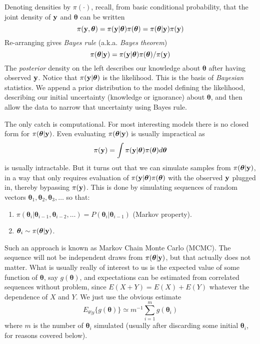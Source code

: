 \documentclass[10pt] {article}
\theoremstyle{definition}
\begin{document}
Denoting densities by $\pi(\cdot)$, recall, from basic conditional probability, that the joint density of ${\bf y}$ and ${\bm \theta}$ can be written
$$
\pi({\bf y}, {\bm \theta}) = \pi({\bf y} | {\bm \theta})\pi ({\bm \theta}) = \pi( {\bm \theta}|{\bf y})\pi ({\bf y})
$$
Re-arranging gives {\em Bayes rule} (a.k.a. {\em Bayes theorem})
$$
\pi( {\bm \theta}|{\bf y}) = \pi({\bf y} | {\bm \theta})\pi ({\bm \theta})/\pi({\bf y})
$$
The {\em posterior} density on the left describes our knowledge about $\bm \theta$ after having observed $\bf y$. Notice that $ \pi({\bf y} | {\bm \theta})$ is the likelihood. This is the basis of {\em Bayesian} statistics. We append a prior distribution to the model defining the likelihood, describing our initial uncertainty (knowledge or ignorance) about $\bm \theta$, and then allow the data to narrow that uncertainty using Bayes rule.

The only catch is computational. For most interesting models there is no closed form for $\pi( {\bm \theta}|{\bf y})$. Even evaluating $\pi( {\bm \theta}|{\bf y})$ is usually impractical as 
$$
\pi({\bf y}) = \int \pi({\bf y} | {\bm \theta})\pi ({\bm \theta}) d{\bm \theta}
$$
is usually intractable.
But it turns out that we can simulate samples from $\pi( {\bm \theta}|{\bf y})$, in a way that  only requires evaluation of $\pi({\bf y} | {\bm \theta})\pi ({\bm \theta})$ with the observed $\bf y$ plugged in, thereby bypassing $\pi ({\bf y})$. This is done by simulating sequences of random vectors ${\bm \theta}_1, {\bm \theta}_2, {\bm \theta}_3, \ldots $ so that:
\begin{enumerate}
\item $\pi({\bm \theta}_i|{\bm \theta}_{i-1},{\bm \theta}_{i-2},\ldots) = P({\bm \theta}_i|{\bm \theta}_{i-1})$ (Markov property).
\item ${\bm \theta}_i \sim \pi( {\bm \theta}|{\bf y})$.\end{enumerate}
Such an approach is known as Markov Chain Monte Carlo (MCMC). The sequence will not be independent draws from $ \pi( {\bm \theta}|{\bf y})$, but that actually does not matter. What is usually really of interest to us is the expected value of some function of $\bm \theta$, say $g({\bm \theta})$, and expectations can be estimated from correlated sequences without problem, since $E(X+Y) = E(X)+E(Y)$ whatever the dependence of $X $ and $Y$. We just use the obvious estimate
$$
E_{\theta|y}\{g({\bm \theta})\} \simeq m^{-1}\sum_{i=1}^m g({\bm \theta}_i)
$$ 
where $m$ is the number of ${\bm \theta}_i$ simulated (usually after discarding some initial ${\bm \theta}_i$, for reasons covered below). 
\end{document}
